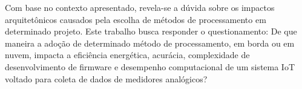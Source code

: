Com base no contexto apresentado, 
revela-se a dúvida sobre os impactos arquitetônicos 
causados pela escolha de métodos de processamento em determinado projeto. 
Este trabalho busca responder o questionamento: 
De que maneira a adoção de determinado método de processamento, 
em borda ou em nuvem, impacta a eficiência energética, acurácia, 
complexidade de desenvolvimento de firmware e desempenho 
computacional de um sistema IoT voltado 
para coleta de dados de medidores analógicos?